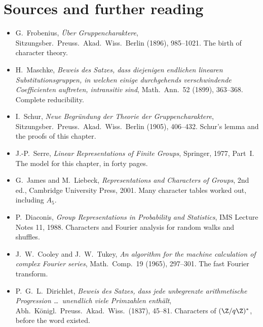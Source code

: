 \section*{Sources and further reading}

\begin{itemize}
\item G.~Frobenius, \emph{Über Gruppencharaktere}, Sitzungsber.\ Preuss.\ Akad.\ Wiss.\ Berlin (1896), 985--1021. The birth of character theory.
\item H.~Maschke, \emph{Beweis des Satzes, dass diejenigen endlichen linearen Substitutionsgruppen, in welchen einige durchgehends verschwindende Coefficienten auftreten, intransitiv sind}, Math.\ Ann.\ 52 (1899), 363--368. Complete reducibility.
\item I.~Schur, \emph{Neue Begründung der Theorie der Gruppencharaktere}, Sitzungsber.\ Preuss.\ Akad.\ Wiss.\ Berlin (1905), 406--432. Schur's lemma and the proofs of this chapter.
\item J.-P.~Serre, \emph{Linear Representations of Finite Groups}, Springer, 1977, Part~I. The model for this chapter, in forty pages.
\item G.~James and M.~Liebeck, \emph{Representations and Characters of Groups}, 2nd ed., Cambridge University Press, 2001. Many character tables worked out, including $A_5$.
\item P.~Diaconis, \emph{Group Representations in Probability and Statistics}, IMS Lecture Notes 11, 1988. Characters and Fourier analysis for random walks and shuffles.
\item J.~W.~Cooley and J.~W.~Tukey, \emph{An algorithm for the machine calculation of complex Fourier series}, Math.\ Comp.\ 19 (1965), 297--301. The fast Fourier transform.
\item P.~G.~L.~Dirichlet, \emph{Beweis des Satzes, dass jede unbegrenzte arithmetische Progression \dots\ unendlich viele Primzahlen enthält}, Abh.\ Königl.\ Preuss.\ Akad.\ Wiss.\ (1837), 45--81. Characters of $(\Z/q\Z)^*$, before the word existed.
\end{itemize}
